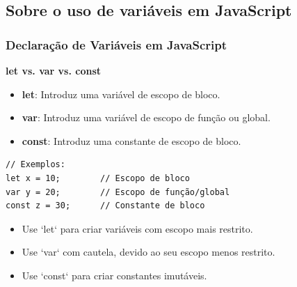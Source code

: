 \documentclass[13pt, xcolor={dvipsnames,svgnames}, portuguese]{beamer}
\begin{document}
\subsection{Sobre o uso de variáveis em JavaScript}

\begin{frame}[fragile]
\frametitle{Declaração de Variáveis em JavaScript}

\textbf{let vs. var vs. const}

\begin{itemize}
  \item \textbf{let}: Introduz uma variável de escopo de bloco.
  \item \textbf{var}: Introduz uma variável de escopo de função ou global.
  \item \textbf{const}: Introduz uma constante de escopo de bloco.
\end{itemize}

\begin{verbatim}
// Exemplos:
let x = 10;        // Escopo de bloco
var y = 20;        // Escopo de função/global
const z = 30;      // Constante de bloco
\end{verbatim}

\begin{itemize}
  \item Use `let` para criar variáveis com escopo mais restrito.
  \item Use `var` com cautela, devido ao seu escopo menos restrito.
  \item Use `const` para criar constantes imutáveis.
\end{itemize}

\end{frame}
\end{document}
